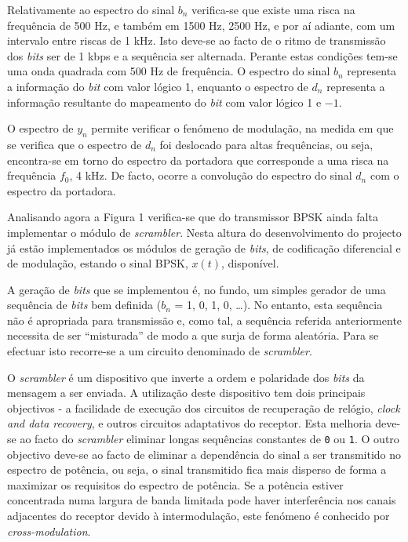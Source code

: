 \documentclass[11pt]{article}
\numberwithin{equation}{section}
\begin{document}
Relativamente ao espectro do sinal $b_n$ verifica-se que existe uma risca na frequência de 500 Hz, e também em 1500 Hz, 2500 Hz, e por aí adiante, com um intervalo entre riscas de 1 kHz. Isto deve-se ao facto de o ritmo de transmissão dos \textit{bits} ser de 1 kbps e a sequência ser alternada. Perante estas condições tem-se uma onda quadrada com 500 Hz de frequência. O espectro do sinal $b_n$ representa a informação do \textit{bit} com valor lógico 1, enquanto o espectro de $d_n$ representa a informação resultante do mapeamento do \textit{bit} com valor lógico 1 e $-1$. 

O espectro de $y_n$ permite verificar o fenómeno de modulação, na medida em que se verifica que o espectro de $d_n$ foi deslocado para altas frequências, ou seja, encontra-se em torno do espectro da portadora que corresponde a uma risca na frequência $f_0$, 4 kHz. De facto, ocorre a convolução do espectro do sinal $d_n$ com o espectro da portadora.

Analisando agora a Figura 1 verifica-se que do transmissor BPSK ainda falta implementar o módulo de \textit{scrambler}. Nesta altura do desenvolvimento do projecto já estão implementados os módulos de geração de \textit{bits}, de codificação diferencial e de modulação, estando o sinal BPSK, $x\left(t\right)$, disponível.

A geração de \textit{bits} que se implementou é, no fundo, um simples gerador de uma sequência de \textit{bits} bem definida ($b_n$ = 1, 0, 1, 0, \ldots). No entanto, esta sequência não é apropriada para transmissão e, como tal, a sequência referida anteriormente necessita de ser ``misturada'' de modo a que surja de forma aleatória. Para se efectuar isto recorre-se a um circuito denominado de \textit{scrambler}.

O \textit{scrambler} é um dispositivo que inverte a ordem e polaridade dos \textit{bits} da mensagem a ser enviada. A utilização deste dispositivo tem dois principais objectivos - a facilidade de execução dos circuitos de recuperação de relógio, \textit{clock and data recovery}, e outros circuitos adaptativos do receptor. Esta melhoria deve-se ao facto do \textit{scrambler} eliminar longas sequências constantes de \texttt{0} ou \texttt{1}. O outro objectivo deve-se ao facto de eliminar a dependência do sinal a ser transmitido no espectro de potência, ou seja, o sinal transmitido fica mais disperso de forma a maximizar os requisitos do espectro de potência. Se a potência estiver concentrada numa largura de banda limitada pode haver interferência nos canais adjacentes do receptor devido à intermodulação, este fenómeno é conhecido por \textit{cross-modulation}.
\end{document}
